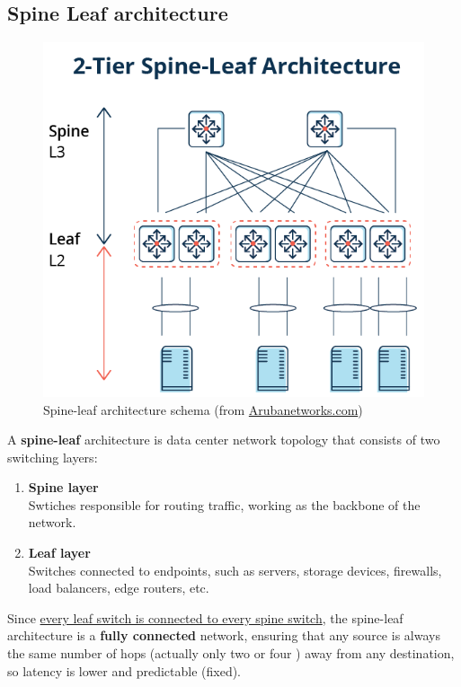 \subsection{Spine Leaf architecture}
\label{sec:spineleaf}
\begin{figure}[htbp]
   \centering
   \includegraphics{images/spineleaf.png}
   \caption{Spine-leaf architecture schema (from \href{https://www.arubanetworks.com/faq/what-is-spine-leaf-architecture/}{Arubanetworks.com})}
   \label{fig:}
\end{figure}
A \textbf{spine-leaf} architecture is data center network topology that consists of two switching layers:
\begin{enumerate}
   \item \textbf{Spine layer}\\
   Swtiches responsible for routing traffic, working as the backbone of the network.   
   \item \textbf{Leaf layer}\\
   Switches connected to endpoints, such as servers, storage devices, firewalls, load balancers, edge routers, etc.
\end{enumerate}
Since \ul{every leaf switch is connected to every spine switch}, the spine-leaf architecture is a \textbf{fully connected} network,
ensuring that any source is always the same number of hops (actually only two or four \smiley) away from any destination, so latency is lower and predictable (fixed).

